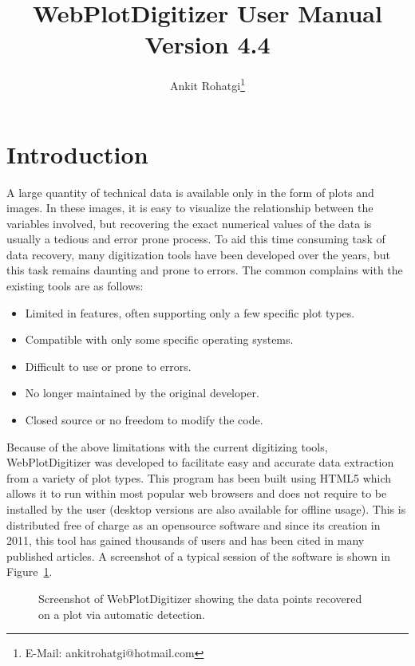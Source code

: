 \documentclass[letterpaper, 11pt]{article}
\begin{document}
\title{WebPlotDigitizer User Manual\\ Version 4.4}
\author{Ankit Rohatgi\footnote{E-Mail: ankitrohatgi@hotmail.com}}
\maketitle
\tableofcontents
\newpage
\section{Introduction}
A large quantity of technical data is available only in the form of plots and images. In these images, it is easy to visualize the relationship between the variables involved, but recovering the exact numerical values of the data is usually a tedious and error prone process. To aid this time consuming task of data recovery, many digitization tools have been developed over the years, but this task remains daunting and prone to errors. The common complains with the existing tools are as follows:

\begin{itemize}
\item{Limited in features, often supporting only a few specific plot types.}
\item{Compatible with only some specific operating systems.}
\item{Difficult to use or prone to errors.}
\item{No longer maintained by the original developer.}
\item{Closed source or no freedom to modify the code.}
\end{itemize}

Because of the above limitations with the current digitizing tools, WebPlotDigitizer was developed to facilitate easy and accurate data extraction from a variety of plot types. This program has been built using HTML5 which allows it to run within most popular web browsers and does not require to be installed by the user (desktop versions are also available for offline usage). This is distributed free of charge as an opensource software and since its creation in 2011, this tool has gained thousands of users and has been cited in many published articles. A screenshot of a typical session of the software is shown in Figure~\ref{fig:screenshot}.

\begin{figure}
\begin{center}
\caption{Screenshot of WebPlotDigitizer showing the data points recovered on a plot via automatic detection.}
\label{fig:screenshot}
\end{center}
\end{figure}
\end{document}
